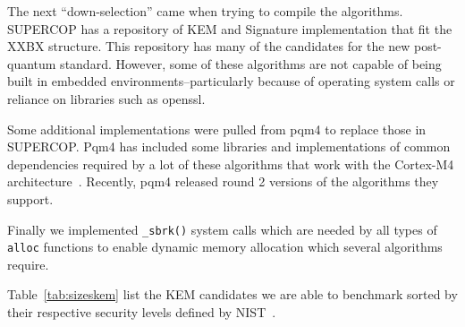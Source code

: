 \documentclass[10pt]{article}
\begin{document}
The next ``down-selection'' came when trying to compile the algorithms. 
SUPERCOP has a repository of KEM and Signature implementation that fit the XXBX structure. 
This repository has many of the candidates for the new post-quantum standard. 
However, some of these algorithms are not capable of being built in embedded 
environments--particularly because of operating system calls or reliance on 
libraries such as openssl.

Some additional implementations were pulled from pqm4 to replace those in SUPERCOP. 
Pqm4 has included some libraries and implementations of common dependencies required by 
a lot of these algorithms that work with the Cortex-M4 architecture~\cite{PQM4}. 
Recently, pqm4 released round 2 versions of the algorithms they support.


Finally we implemented \texttt{\_sbrk()} system calls which are needed by all 
types of \texttt{alloc} functions to enable dynamic memory allocation which several 
algorithms require.

Table~\ref{tab:sizeskem} list the KEM candidates we are able to benchmark sorted by 
their respective security levels defined by NIST~\cite{pqccfp}.  
\end{document}
